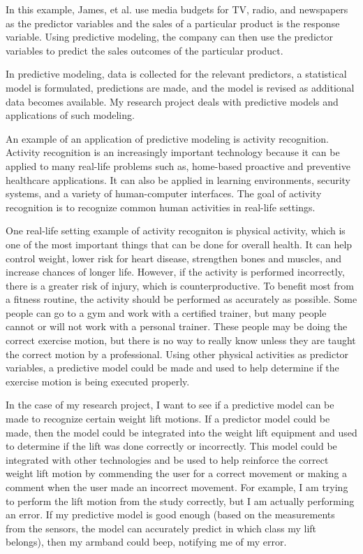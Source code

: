 \documentclass[12pt,twoside]{reedthesis}
\begin{document}
  In this example, James, et al. use media budgets for TV, radio, and
  newspapers as the predictor variables and the sales of a particular
  product is the response variable. Using predictive modeling, the company
  can then use the predictor variables to predict the sales outcomes of
  the particular product.
  
  In predictive modeling, data is collected for the relevant predictors, a
  statistical model is formulated, predictions are made, and the model is
  revised as additional data becomes available. My research project deals
  with predictive models and applications of such modeling.
  
  An example of an application of predictive modeling is activity
  recognition. Activity recognition is an increasingly important
  technology because it can be applied to many real-life problems such as,
  home-based proactive and preventive healthcare applications. It can also
  be applied in learning environments, security systems, and a variety of
  human-computer interfaces. The goal of activity recognition is to
  recognize common human activities in real-life settings.
  
  One real-life setting example of activity recogniton is physical
  activity, which is one of the most important things that can be done for
  overall health. It can help control weight, lower risk for heart
  disease, strengthen bones and muscles, and increase chances of longer
  life. However, if the activity is performed incorrectly, there is a
  greater risk of injury, which is counterproductive. To benefit most from
  a fitness routine, the activity should be performed as accurately as
  possible. Some people can go to a gym and work with a certified trainer,
  but many people cannot or will not work with a personal trainer. These
  people may be doing the correct exercise motion, but there is no way to
  really know unless they are taught the correct motion by a professional.
  Using other physical activities as predictor variables, a predictive
  model could be made and used to help determine if the exercise motion is
  being executed properly.
  
  In the case of my research project, I want to see if a predictive model
  can be made to recognize certain weight lift motions. If a predictor
  model could be made, then the model could be integrated into the weight
  lift equipment and used to determine if the lift was done correctly or
  incorrectly. This model could be integrated with other technologies and
  be used to help reinforce the correct weight lift motion by commending
  the user for a correct movement or making a comment when the user made
  an incorrect movement. For example, I am trying to perform the lift
  motion from the study correctly, but I am actually performing an error.
  If my predictive model is good enough (based on the measurements from
  the sensors, the model can accurately predict in which class my lift
  belongs), then my armband could beep, notifying me of my error.
  
\end{document}
